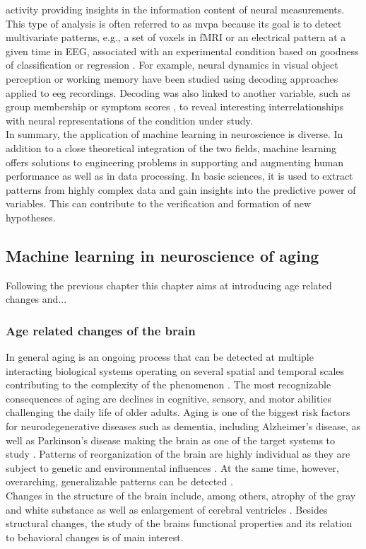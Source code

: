 activity providing insights in the information content of neural measurements. This type of analysis is often referred to as \gls{mvpa} because its goal is to detect multivariate patterns, e.g., a set of voxels in fMRI or an electrical pattern at a given time in EEG, associated with an experimental condition based on goodness of classification or regression \cite{Holdgraf2017}. For example, neural dynamics in visual object perception \cite{Cauchoix2014} or working memory \cite{Bae2018} have been studied using decoding approaches applied to \gls{eeg} recordings. Decoding was also linked to another variable, such as group membership \cite{Csizmadia2021, Bae2020} or symptom scores \cite{Coutanche2011} , to reveal interesting interrelationships with neural representations of the condition under study.\\
In summary, the application of machine learning in neuroscience is diverse. In addition to a close theoretical integration of the two fields, machine learning offers solutions to engineering problems in supporting and augmenting human performance as well as in data processing. In basic sciences, it is used to extract patterns from highly complex data and gain insights into the predictive power of variables. This can contribute to the verification and formation of new hypotheses.

\subsection{Machine learning in neuroscience of aging}
Following the previous chapter this chapter aims at introducing age related changes and...

\subsubsection{Age related changes of the brain}

In general aging is an ongoing process that can be detected at multiple interacting biological systems operating on several spatial and temporal scales contributing to the complexity of the phenomenon \cite{Mooney2016}. The most recognizable consequences of aging are declines in cognitive, sensory, and motor abilities challenging the daily life of older adults. Aging is one of the biggest risk factors for neurodegenerative diseases such as dementia, including Alzheimer's disease, as well as Parkinson's disease making the brain as one of the target systems to study \cite{}. Patterns of reorganization of the brain are highly individual as they are subject to genetic and environmental influences \cite{Smith2020}. At the same time, however, overarching, generalizable patterns can be detected \cite{Salthouse2019}.\\
Changes in the structure of the brain include, among others, atrophy of the gray and white substance as well as enlargement of cerebral ventricles \cite{Fjell2010}. Besides structural changes, the study of the brains functional properties and its relation to behavioral changes is of main interest. 

